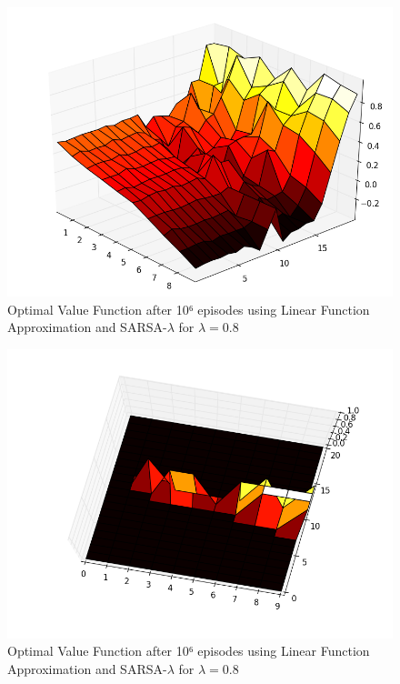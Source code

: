 \documentclass[12pt,a4paper]{article}
\begin{document}
\begin{figure}[!ht]
   \caption{\label{E21_SL_LA_V} Optimal Value Function after 10⁶ episodes using Linear Function Approximation and SARSA-$\lambda$ for $\lambda=0.8$}
   \includegraphics[scale=0.4]{Easy21_Results/Sarsa_0_8_linear_app_value_1e6.png}
\end{figure}

\begin{figure}[!ht]
   \caption{\label{E21_SL_LA_D} Optimal Value Function after 10⁶ episodes using Linear Function Approximation and SARSA-$\lambda$ for $\lambda=0.8$}
   \includegraphics[scale=0.4]{Easy21_Results/Sarsa_0_8_linear_app_decision_1e6.png}
\end{figure}
\end{document}
